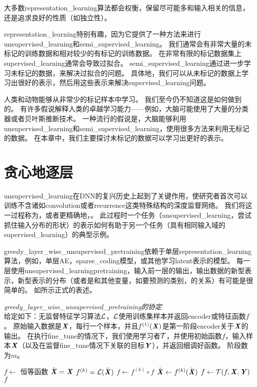 大多数\gls{representation_learning}算法都会权衡，保留尽可能多和输入相关的信息，还是追求良好的性质（如独立性）。


\gls{representation_learning}特别有趣，因为它提供了一种方法来进行\gls{unsupervised_learning}和\gls{semi_supervised_learning}。
我们通常会有非常大量的未标记的训练数据和相对较少的有标记的训练数据。
在非常有限的标记数据集上\gls{supervised_learning}通常会导致过拟合。
\gls{semi_supervised_learning}通过进一步学习未标记的数据，来解决过拟合的问题。
具体地，我们可以从未标记的数据上学习出很好的表示，然后用这些表示来解决\gls{supervised_learning}问题。


人类和动物能够从非常少的标记样本中学习。
我们至今仍不知道这是如何做到的。
有许多假说解释人类的卓越学习能力——例如，大脑可能使用了大量的分类器或者贝叶斯推断技术。
一种流行的假说是，大脑能够利用\gls{unsupervised_learning}和\gls{semi_supervised_learning}，使用很多方法来利用无标记的数据。
在本章中，我们主要探讨未标记的数据可以学习出更好的表示。


\section{贪心地逐层 }
\label{sec:greedy_layer_wise_unsupervised_pretraining}
\gls{unsupervised_learning}在\gls{DNN}的复兴历史上起到了关键作用，使研究者首次可以训练不含诸如\gls{convolution}或者\gls{recurrence}这类特殊结构的深度监督网络。
我们将这一过程称为，或者更精确地，。
此过程时一个任务（\gls{unsupervised_learning}，尝试抓住输入分布的形状）的表示如何有助于另一个任务（具有相同输入域的\gls{supervised_learning}）的典型示例。


\gls{greedy_layer_wise_unsupervised_pretraining}依赖于单层\gls{representation_learning}算法，例如，单层\gls{AE}，\gls{sparse_coding}模型，或其他学习\gls{latent}表示的模型。
每一层使用\gls{unsupervised_learning}\gls{pretraining}，输入前一层的输出，输出数据的新型表示，新型表示的分布（或者是和其他变量，如要预测的类别，的关系）有可能是很简单的。
如所示正式的表述。

\begin{algorithm}
\caption{ {\em \gls{greedy_layer_wise_unsupervised_pretraining}的协定}\\
给定如下：无监督特征学习算法$\mathcal{L}$，$\mathcal{L}$使用训练集样本并返回\gls{encoder}或特征函数$f$。
原始输入数据是$\boldsymbol{\mathit{X}}$，每行一个样本，并且$f^{(1)}(\boldsymbol{\mathit{X}})$是第一阶段\gls{encoder}关于$\boldsymbol{\mathit{X}}$的输出。
在执行\gls{fine_tune}的情况下，我们使用学习者$\mathcal{T}$，并使用初始函数$f$，输入样本$\boldsymbol{\mathit{X}}$（以及在监督\gls{fine_tune}情况下关联的目标$\boldsymbol{\mathit{Y}}$），并返回细调好函数。 阶段数为$m$。
}
\label{alg:pretraining}
\begin{algorithmic}
\STATE $f \leftarrow$ 恒等函数
\STATE $\tilde{\boldsymbol{\mathit{X}}} = \boldsymbol{\mathit{X}}$
  \STATE $f^{(k)} = {\mathcal{L}}(\tilde{\boldsymbol{\mathit{X}}})$
  \STATE $f \leftarrow f^{(k)} \circ f$
  \STATE $\tilde{\boldsymbol{\mathit{X}}} \leftarrow f^{(k)}(\tilde{\boldsymbol{\mathit{X}}})$
\ENDFOR
{}
  \STATE $f \leftarrow {\mathcal{T}}(f,\boldsymbol{\mathit{X}},\boldsymbol{\mathit{Y}})$
\ENDIF
{} $f$
\end{algorithmic}
\end{algorithm}


